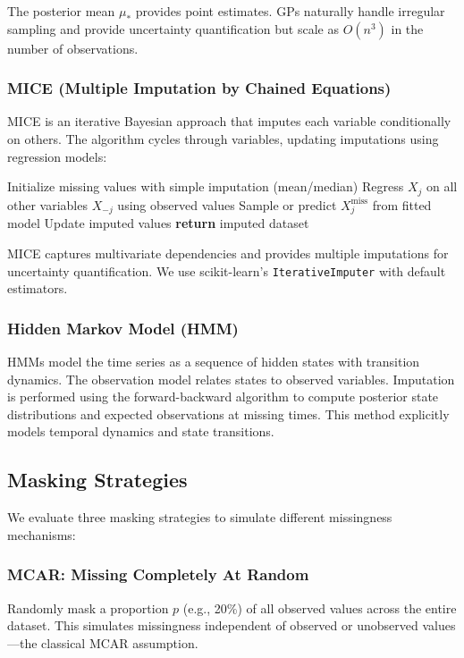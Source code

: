 \documentclass[11pt]{article}
\begin{document}
The posterior mean $\mu_*$ provides point estimates. GPs naturally handle irregular sampling and provide uncertainty quantification but scale as $O(n^3)$ in the number of observations.

\subsubsection{MICE (Multiple Imputation by Chained Equations)}
MICE is an iterative Bayesian approach that imputes each variable conditionally on others. The algorithm cycles through variables, updating imputations using regression models:
\begin{algorithm}[H]
\caption{MICE Algorithm}
\begin{algorithmic}[1]
\STATE Initialize missing values with simple imputation (mean/median)
        \STATE Regress $X_j$ on all other variables $X_{-j}$ using observed values
        \STATE Sample or predict $X_j^{\text{miss}}$ from fitted model
        \STATE Update imputed values
    \ENDFOR
\ENDFOR
\STATE \textbf{return} imputed dataset
\end{algorithmic}
\end{algorithm}

MICE captures multivariate dependencies and provides multiple imputations for uncertainty quantification. We use scikit-learn's \texttt{IterativeImputer} with default estimators.

\subsubsection{Hidden Markov Model (HMM)}
HMMs model the time series as a sequence of hidden states with transition dynamics. The observation model relates states to observed variables. Imputation is performed using the forward-backward algorithm to compute posterior state distributions and expected observations at missing times. This method explicitly models temporal dynamics and state transitions.

\subsection{Masking Strategies}

We evaluate three masking strategies to simulate different missingness mechanisms:

\subsubsection{MCAR: Missing Completely At Random}
Randomly mask a proportion $p$ (e.g., 20\%) of all observed values across the entire dataset. This simulates missingness independent of observed or unobserved values—the classical MCAR assumption.
\end{document}
